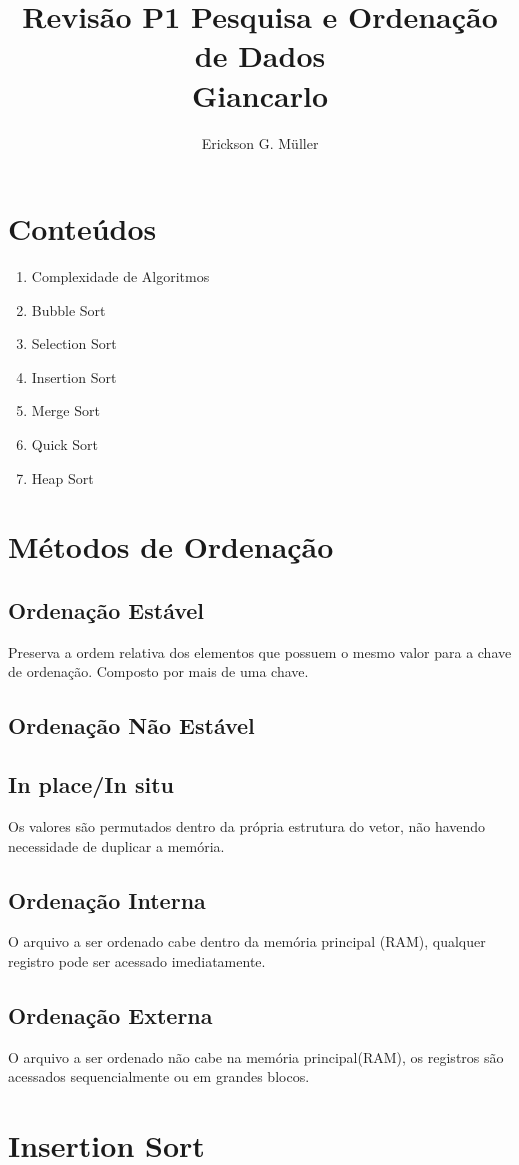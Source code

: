 \documentclass[•]{article}
\title{Revisão P1 Pesquisa e Ordenação de Dados\\Giancarlo}
\author{Erickson G. Müller}
\begin{document}
	\maketitle
	\section{Conteúdos}
		\begin{enumerate}
			\item Complexidade de Algoritmos
			\item Bubble Sort
			\item Selection Sort
			\item Insertion Sort
			\item Merge Sort
			\item Quick Sort
			\item Heap Sort
		\end{enumerate}
	\newpage
	\section{Métodos de Ordenação}
		\subsection{Ordenação Estável}
			Preserva a ordem relativa dos elementos que possuem o mesmo valor para a chave de ordenação. Composto por mais de uma chave.
		\subsection{Ordenação Não Estável}
		\subsection{In place/In situ}
			Os valores são permutados dentro da própria estrutura do vetor, não havendo necessidade de duplicar a memória.
		\subsection{Ordenação Interna}
			O arquivo a ser ordenado cabe dentro da memória principal (RAM), qualquer registro pode ser acessado imediatamente.
		\subsection{Ordenação Externa}
			O arquivo a ser ordenado não cabe na memória principal(RAM), os registros são acessados sequencialmente ou em grandes blocos.
	\section{Insertion Sort}
		
\end{document}
